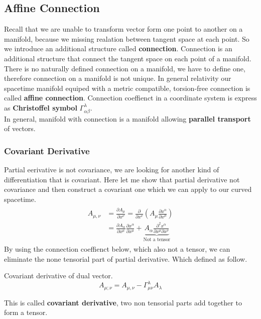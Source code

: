 \documentclass[12pt]{article}
\theoremstyle{mystyle}{\newtheorem{definition}{Definition}[section]}
\theoremstyle{mystyle}{\newtheorem{theorem}[definition]{Theorem}}
\theoremstyle{mystyle}{\newtheorem*{remark}{Remark}}
\theoremstyle{mystyle}{\newtheorem*{example}{Example}}
\theoremstyle{mystyle}{\newtheorem*{examples}{Examples}}
\theoremstyle{cstyle}{\newtheorem*{cthm}{}}
\begin{document}
\subsection{Affine Connection}
Recall that we are unable to transform vector form one point to another on a manifold,
because we missing realation between tangent space at each point. So we introduce an additional structure called \textbf{connection}.
Connection is an additional structure that connect the tangent space on each point of a manifold.
There is no naturally defined connection on a manifold, we have to define one, therefore connection on a manifold is not unique.
In general relativity our spacetime manifold equiped with a metric compatible, torsion-free connection is called \textbf{affine connection}. 
Connection coeffienct in a coordinate system is express as \textbf{Christoffel symbol} \(\Gamma^{\lambda}_{\alpha\beta}\).\\
In general, manifold with connection is a manifold allowing \textbf{parallel transport} of vectors.

\subsubsection{Covariant Derivative}
Partial eerivative is not covariance, we are looking for another kind of differentiation that is covariant.
Here let me show that partial derivative not covariance and then construct a covariant one which we can apply to our curved spacetime.
\begin{align*}
  \begin{split}
    A_{\mu,\nu} &= \frac{\partial A_{\mu}}{\partial x^{\nu}} = \frac{\partial}{\partial x^{\nu}}
    \left( A_{\mu}\frac{\partial x^{\alpha}}{\partial x^{\mu}}\right)\\
    &= \frac{\partial A_\alpha}{\partial x^{\mu}}\frac{\partial x^{\alpha}}{\partial x^{\mu}}+
    \underbrace{A_{\alpha} \frac{\partial^2 x^{\alpha}}{\partial x^{\mu} \partial x^{\nu}}}_\text{Not a tensor}
  \end{split}
\end{align*}
By using the connection coeffienct below, which also not a tensor, we can eliminate the none tensorial part of partial derivative.
Which defined as follow.
\begin{definition}
  Covariant derivative of dual vector.
  \[A_{\mu;\nu} = A_{\mu,\nu} - \Gamma^{\lambda}_{\mu\nu}A_{\lambda}\]
\end{definition}

This is called \textbf{covariant derivative}, two non tensorial parts add together to form a tensor.
\end{document}
